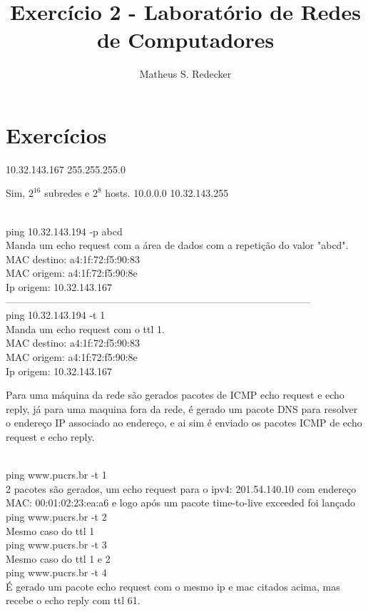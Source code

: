 \documentclass[12pt]{article}
\title{Exercício 2 - Laboratório de Redes de Computadores}
\author{Matheus S. Redecker\inst{1}}
\begin{document}
 

\maketitle

\section{Exercícios}

         10.32.143.167
          255.255.255.0
        
         Sim, $2^{16}$ subredes e $2^{8}$ hosts.
         10.0.0.0 
         10.32.143.255
        
         \\
        ping 10.32.143.194 -p abcd \\
        Manda um echo request com a área de dados com a repetição do valor "abcd". \\
        MAC destino: a4:1f:72:f5:90:83 \\
        MAC origem: a4:1f:72:f5:90:8e\\
        Ip origem: 10.32.143.167\\
        -------------------------------------------------------------------------------------------- \\
        ping 10.32.143.194 -t 1\\
        Manda um echo request com o ttl 1. \\
        MAC destino: a4:1f:72:f5:90:83 \\
        MAC origem: a4:1f:72:f5:90:8e\\
        Ip origem: 10.32.143.167
        
         Para uma máquina da rede são gerados pacotes de ICMP echo request e echo reply, já para uma maquina fora da rede, é gerado um pacote DNS para resolver o endereço IP associado ao endereço, e ai sim é enviado os pacotes ICMP de echo request e echo reply.
        
        \\
         ping www.pucrs.br -t 1\\
         2 pacotes são gerados, um echo request para o ipv4: 201.54.140.10 com endereço MAC: 00:01:02:23:ea:a6 e logo após um pacote time-to-live exceeded foi lançado \\
         ping www.pucrs.br -t 2 \\
         Mesmo caso do ttl 1 \\
         ping www.pucrs.br -t 3 \\
         Mesmo caso do ttl 1 e 2\\
         ping www.pucrs.br -t 4 \\
         É gerado um pacote echo request com o mesmo ip e mac citados acima, mas recebe o echo reply com ttl 61.
         
\end{document}
